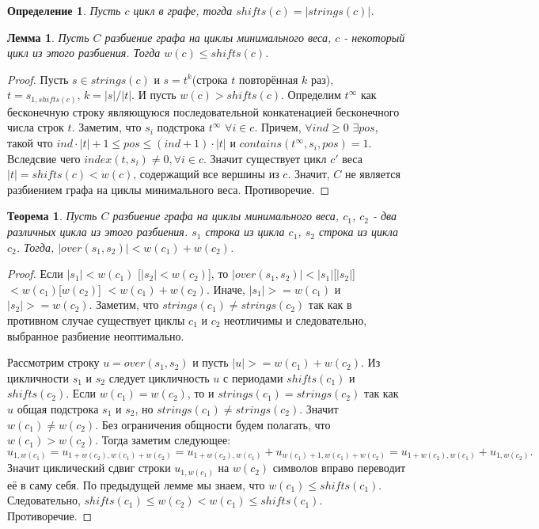 \documentclass[a4paper,10pt]{article}
\newtheorem{theorem}{Теорема}
\newtheorem{lemma}{Лемма}
\newtheorem{definition}{Определение}
\begin{document}
\begin{definition}
Пусть $c$ цикл в графе, тогда $shifts(c) = |strings(c)|$.
\end{definition}

\begin{lemma}
Пусть $C$ разбиение графа на циклы минимального веса, $c$ - некоторый цикл из этого разбиения.
Тогда $w(c) \leq shifts(c)$.
\end{lemma}

\begin{proof}
Пусть $s \in strings(c)$ и $s = t^k$(строка $t$ повторённая $k$ раз), $t = s_{1, shifts(c)}$, $k = |s| / |t|$.
И пусть $w(c) > shifts(c)$.
Определим $t^\infty$ как бесконечную строку являющуюся последовательной конкатенацией бесконечного числа строк $t$.
Заметим, что $s_i$ подстрока $t^\infty$ $\forall i \in c$. Причем, $\forall ind \geq 0$ $\exists pos$, такой что $ind \cdot |t| + 1 \leq pos \leq (ind + 1) \cdot |t|$
и $contains(t^\infty, s_i, pos) = 1$. 
Вследсвие чего $index(t, s_i) \ne 0, \forall i \in c$. Значит существует цикл $c'$ веса $|t| = shifts(c) < w(c)$, содержащий все вершины из $c$.
Значит, $C$ не является разбиением графа на циклы минимального веса. Противоречие.
\end{proof}

\begin{theorem}
Пусть $C$ разбиение графа на циклы минимального веса, $c_1$, $c_2$ - два различных цикла из этого разбиения.
$s_1$ строка из цикла $c_1$, $s_2$ строка из цикла $c_2$. Тогда, $|over(s_1, s_2)| < w(c_1) + w(c_2)$.
\end{theorem}

\begin{proof}
Если $|s_1| < w(c_1)$ [$|s_2| < w(c_2)$], то $|over(s_1, s_2)| < |s_1|$[$|s_2|$] $< w(c_1)$[$w(c_2)$] $< w(c_1) + w(c_2)$.
Иначе, $|s_1| >= w(c_1)$ и $|s_2| >= w(c_2)$. 
Заметим, что $strings(c_1) \ne strings(c_2)$ так как в противном случае существует циклы $c_1$ и $c_2$ неотличимы 
и следовательно, выбранное разбиение неоптимально.

Рассмотрим строку $u = over(s_1, s_2)$ и пусть $|u| >= w(c_1) + w(c_2)$.
Из цикличности $s_1$ и $s_2$ следует цикличность $u$ с периодами $shifts(c_1)$ и $shifts(c_2)$.
Если $w(c_1) = w(c_2)$, то и $strings(c_1) = strings(c_2)$ так как $u$ общая подстрока $s_1$ и $s_2$, но $strings(c_1) \ne strings(c_2)$.
Значит $w(c_1) \ne w(c_2)$. Без ограничения общности будем полагать, что $w(c_1) > w(c_2)$.
Тогда заметим следующее:
\[
	u_{1, w(c_1)} = 
	u_{1 + w(c_2), w(c_1) + w(c_2)} = 
	u_{1 + w(c_2), w(c_1)} + u_{w(c_1) + 1, w(c_1) + w(c_2)} = 
	u_{1 + w(c_2), w(c_1)} + u_{1, w(c_2)}.
\]
Значит циклический сдвиг строки $u_{1, w(c_1)}$ на $w(c_2)$ символов вправо переводит её в саму себя.
По предыдущей лемме мы знаем, что $w(c_1) \leq shifts(c_1)$.
Следовательно, $shifts(c_1) \leq w(c_2) < w(c_1) \leq shifts(c_1)$. 
Противоречие.
\end{proof}
\end{document}
